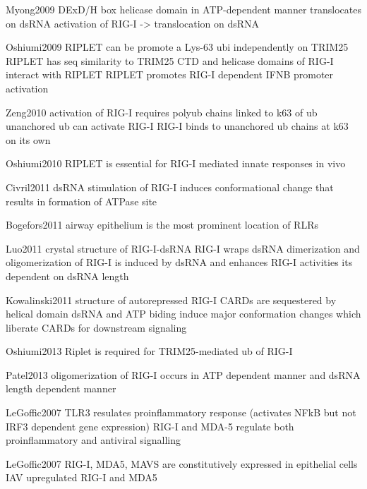 				Myong2009
				DExD/H box helicase domain in ATP-dependent manner translocates on dsRNA
				activation of RIG-I -> translocation on dsRNA
				
				Oshiumi2009
				RIPLET can be promote a Lys-63 ubi independently on TRIM25
				RIPLET has seq similarity to TRIM25
				CTD and helicase domains of RIG-I interact with RIPLET
				RIPLET promotes RIG-I dependent IFNB promoter activation
				
				Zeng2010
				activation of RIG-I requires polyub chains linked to k63 of ub
				unanchored ub can activate RIG-I
				RIG-I binds to unanchored ub chains at k63 on its own
				
				Oshiumi2010
				RIPLET is essential for RIG-I mediated innate responses in vivo
				
				Civril2011
				dsRNA stimulation of RIG-I induces conformational change that results in formation of ATPase site
				
				Bogefors2011
				airway epithelium is the most prominent location of RLRs
				
				Luo2011
				crystal structure of RIG-I-dsRNA
				RIG-I wraps dsRNA
				dimerization and oligomerization of RIG-I is induced by dsRNA and enhances RIG-I activities
				its dependent on dsRNA length
				
				Kowalinski2011
				structure of autorepressed RIG-I
				CARDs are sequestered by helical domain
				dsRNA and ATP biding induce major conformation changes which liberate CARDs for downstream signaling
				
				Oshiumi2013
				Riplet is required for TRIM25-mediated ub of RIG-I
				
				Patel2013
				oligomerization of RIG-I occurs in ATP dependent manner and dsRNA length dependent manner		
				
				LeGoffic2007
				TLR3 resulates proinflammatory response (activates NFkB but not 
				IRF3 dependent gene expression)
				RIG-I and MDA-5 regulate both proinflammatory and antiviral signalling
										
				LeGoffic2007
				RIG-I, MDA5, MAVS are constitutively expressed in epithelial cells
				IAV upregulated RIG-I and MDA5	